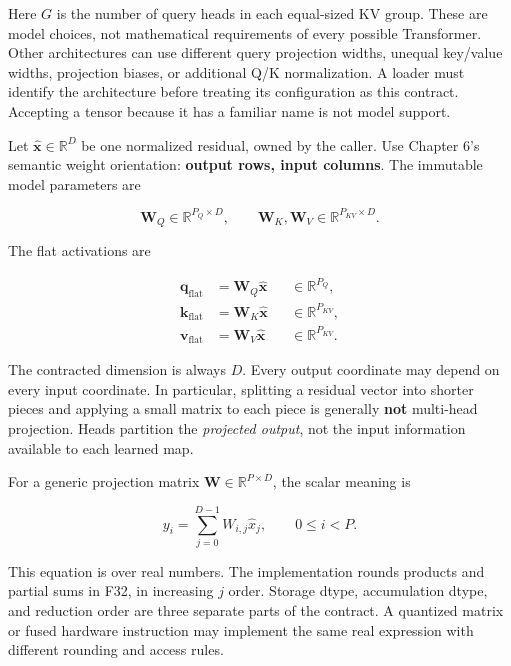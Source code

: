 Here \(G\) is the number of query heads in each equal-sized KV group.
These are model choices, not mathematical requirements of every possible
Transformer. Other architectures can use different query projection
widths, unequal key/value widths, projection biases, or additional Q/K
normalization. A loader must identify the architecture before treating
its configuration as this contract. Accepting a tensor because it has a
familiar name is not model support.

Let \(\widehat{\mathbf{x}}\in\mathbb{R}^{D}\) be one normalized
residual, owned by the caller. Use Chapter 6's semantic weight
orientation: \textbf{output rows, input columns}. The immutable model
parameters are

\begin{equation}
\mathbf{W}_Q\in\mathbb{R}^{P_Q\times D},\qquad
\mathbf{W}_K,\mathbf{W}_V\in\mathbb{R}^{P_{KV}\times D}.
\end{equation}

The flat activations are

\begin{equation}
\begin{aligned}
\mathbf{q}_{\mathrm{flat}}&=\mathbf{W}_Q\widehat{\mathbf{x}}
    &&\in\mathbb{R}^{P_Q},\\
\mathbf{k}_{\mathrm{flat}}&=\mathbf{W}_K\widehat{\mathbf{x}}
    &&\in\mathbb{R}^{P_{KV}},\\
\mathbf{v}_{\mathrm{flat}}&=\mathbf{W}_V\widehat{\mathbf{x}}
    &&\in\mathbb{R}^{P_{KV}}.
\end{aligned}
\end{equation}

The contracted dimension is always \(D\). Every output coordinate may
depend on every input coordinate. In particular, splitting a residual
vector into shorter pieces and applying a small matrix to each piece is
generally \textbf{not} multi-head projection. Heads partition the
\emph{projected output}, not the input information available to each
learned map.

For a generic projection matrix \(\mathbf{W}\in\mathbb{R}^{P\times D}\),
the scalar meaning is

\begin{equation}
y_i=\sum_{j=0}^{D-1}W_{i,j}\widehat{x}_j,
\qquad 0\le i<P.
\end{equation}

This equation is over real numbers. The implementation rounds products
and partial sums in F32, in increasing \(j\) order. Storage dtype,
accumulation dtype, and reduction order are three separate parts of the
contract. A quantized matrix or fused hardware instruction may implement
the same real expression with different rounding and access rules.

